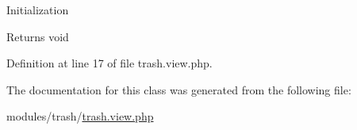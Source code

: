 Initialization \begin{DoxyReturn}{Returns}
void 
\end{DoxyReturn}


Definition at line 17 of file trash.\+view.\+php.



The documentation for this class was generated from the following file\+:\begin{DoxyCompactItemize}
\item 
modules/trash/\hyperlink{trash_8view_8php}{trash.\+view.\+php}\end{DoxyCompactItemize}
